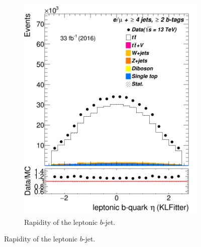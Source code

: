\begin{figure}
\begin{subfigure}{0.25\textwidth}
	\includegraphics[width=\linewidth]{ControlPlots_emujets_2016_4incl_2incl/klf_blep_eta_emujets_2016.png}
	\caption{Rapidity of the leptonic $b$-jet.} \label{fig:K33}
\end{subfigure}	

	
	

	\medskip	





\end{figure}
